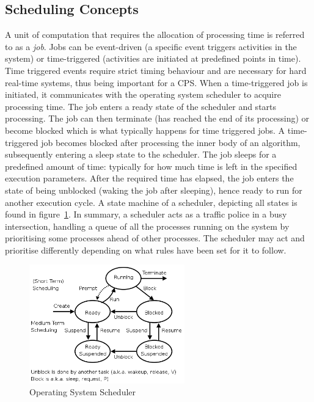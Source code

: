 \subsection{Scheduling Concepts}
A unit of computation that requires the allocation of processing time is referred to as a \textit{job}. Jobs can be event-driven (a specific event triggers activities in the system) or time-triggered (activities are initiated at predefined points in time). Time triggered events require strict timing behaviour and are necessary for hard real-time systems, thus being important for a CPS. When a time-triggered job is initiated, it communicates with the operating system scheduler to acquire processing time. The job enters a ready state of the scheduler and starts processing. The job can then terminate (has reached the end of its processing) or become blocked which is what typically happens for time triggered jobs. A time-triggered job becomes blocked after processing the inner body of an algorithm, subsequently entering a sleep state to the scheduler. The job sleeps for a predefined amount of time: typically for how much time is left in the specified execution parameters. After the required time has elapsed, the job enters the state of being unblocked (waking the job after sleeping), hence ready to run for another execution cycle. A state machine of a scheduler, depicting all states is found in figure~\ref{scheduler}. In summary, a scheduler acts as a traffic police in a busy intersection, handling a queue of all the processes running on the system by prioritising some processes ahead of other processes. The scheduler may act and prioritise differently depending on what rules have been set for it to follow.\\         


\begin{figure}[ht]
\centering
     \includegraphics[width=0.6\textwidth]{./figure/scheduling.png}
      \caption{Operating System Scheduler \cite{sched}}
       \label{scheduler}
\end{figure}



